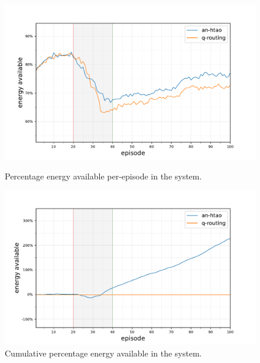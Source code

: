 \begin{figure}[ht]
	\begin{minipage}{.49\textwidth}
		\centering
		\includegraphics[width=1.0\linewidth,trim={25pt 0pt 50pt 0pt},clip]{7balanced_statistics-energy-available}
		\captionsetup{labelfont=bf,singlelinecheck=on}
		\caption{Percentage energy available per-episode \newline in the \simulationNodeFailure{}{} system.}
		\label{fig:node_failure_energy}
	\end{minipage}
	\begin{minipage}{.49\textwidth}
		\centering
		\includegraphics[width=1.0\linewidth,trim={25pt 0pt 50pt 0pt},clip]{7comparison_statistics-energy-available-baseline-comparison-cumulative}
		\captionsetup{labelfont=bf,singlelinecheck=on}
		\caption{Cumulative percentage energy available \newline in the \simulationNodeFailure{}{} system.}
		\label{fig:node_failure_cumulative_energy}
	\end{minipage}\hfill%
\end{figure}

